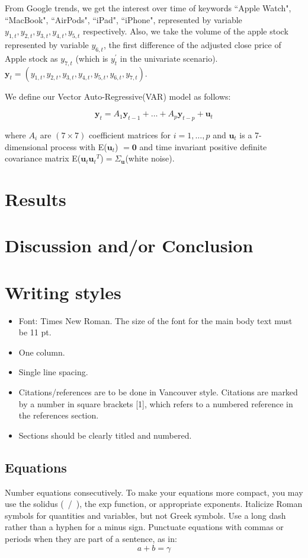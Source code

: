 \documentclass[conference,onecolumn,11pt]{IEEEtran}
\begin{document}
From Google trends, we get the interest over time of keywords ``Apple Watch", ``MacBook", ``AirPods", ``iPad", ``iPhone", represented by variable $y_{1,t},y_{2,t},y_{3,t},y_{4,t},y_{5,t}$ respectively. Also, we take the volume of the apple stock represented by variable $y_{6,t}$, the first difference of the adjusted close price of Apple stock as $y_{7,t}$ (which is $y^{'}_t$ in the univariate scenario). $\mathbf{y}_t = (y_{1,t},y_{2,t},y_{3,t},y_{4,t},y_{5,t},y_{6,t},y_{7,t})$.

We define our Vector Auto-Regressive(VAR) model as follows:

\[
\mathbf{y}_t = A_1\mathbf{y}_{t-1}+\ldots+A_p\mathbf{y}_{t-p}+\mathbf{u}_t
\]

where $A_i$ are $(7\times7)$ coefficient matrices for $i=1,\ldots,p$ and $\mathbf{u}_t$ is a 7-dimensional process with E($\mathbf{u}_t$) $= \mathbf{0}$ and time invariant positive definite covariance matrix E(${\mathbf{u}_t}{\mathbf{u}_t}^T$)$=\Sigma_\mathbf{u}$(white noise).



\section{Results}
\section{Discussion and/or Conclusion}

\section{Writing styles}

\begin{itemize}
\item Font: Times New Roman. The size of the font for the main body text must be 11 pt. 
\item One column. 
\item Single line spacing. 
\item Citations/references are to be done in Vancouver style. Citations are marked by a number in square brackets [1], which refers to a numbered reference in the references section. 
\item Sections should be clearly titled and numbered. 
\end{itemize}

\subsection{Equations}
Number equations consecutively. To make your 
equations more compact, you may use the solidus (~/~), the exp function, or 
appropriate exponents. Italicize Roman symbols for quantities and variables, 
but not Greek symbols. Use a long dash rather than a hyphen for a minus 
sign. Punctuate equations with commas or periods when they are part of a 
sentence, as in:
\begin{equation}
a+b=\gamma\label{eq}
\end{equation}
\end{document}

